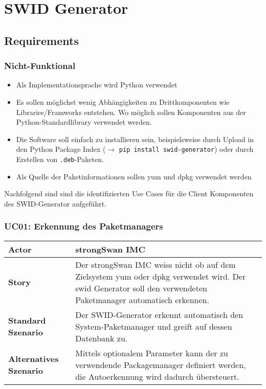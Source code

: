 \chapter{SWID Generator}

\section{Requirements}

\subsection{Nicht-Funktional}

\begin{itemize}
    \item Als Implementationsprache wird Python verwendet
    \item Es sollen möglichst wenig Abhängigkeiten zu Drittkomponenten wie
			Libraries/Framworks entstehen. Wo möglich sollen Komponenten aus der
			Python-Standardlibrary verwendet werden.
    \item Die Software soll einfach zu installieren sein, beispielsweise durch
			Upload in den Python Package Index ($\rightarrow$ \texttt{pip install
			swid-generator}) oder durch Erstellen von \texttt{.deb}-Paketen.
    \item Als Quelle der Paketinformationen sollen yum und dpkg verwendet werden
\end{itemize}

Nachfolgend sind sind die identifizierten Use Cases für die Client Komponenten des SWID-Generator aufgeführt.

\subsection{UC01: Erkennung des Paketmanagers}
\begin{tabularx}{\textwidth}{lX}
\hline 
\textbf{Actor} & strongSwan IMC \\ 
\hline
\textbf{Story} &
Der strongSwan IMC weiss nicht ob auf dem Zielsystem yum oder dpkg verwendet wird. Der swid Generator soll den verwendeten Paketmanager automatisch erkennen. \\
\hline 
\textbf{Standard Szenario} & 
Der SWID-Generator erkennt automatisch den System-Paketmanager und greift auf
dessen Datenbank zu. \\ 
\hline 
\textbf{Alternatives Szenario} &
Mittels optionalem Parameter kann der zu verwendende Packagemanager definiert
werden, die Autoerkennung wird dadurch übersteuert.
\end{tabularx} 

